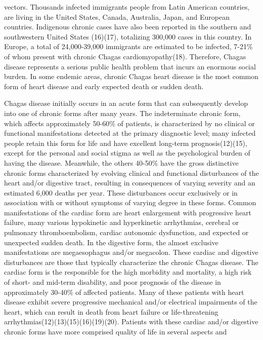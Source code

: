  vectors. Thousands infected immigrants people from Latin American countries, are living
 in the United States, Canada, Australia, Japan, and European countries. Indigenous
 chronic cases have also been reported in the southern and southwestern United States
 (16)(17), totalizing 300,000 cases in this country.
 In Europe, a total of 24,000-39,000 immigrants are estimated to be infected, 7-21\% of
 whom present with chronic Chagas cardiomyopathy(18). Therefore, Chagas disease represents a serious public health problem
 that incurs an enormous social burden. In some endemic areas, chronic Chagas heart
 disease is the most common form of heart disease and early expected death or sudden
 death. \par Chagas disease initially occurs in an acute form that can subsequently develop into one
 of chronic forms after many years. The indeterminate chronic form, which affects
 approximately 50-60\% of patients, is characterized by no clinical or functional
 manifestations detected at the primary diagnostic level; many infected people retain
 this form for life and have excellent long-term prognosis(12)(15), except for the personal and social stigma
 as well as the psychological burden of having the disease. Meanwhile, the others 40-50\%
 have the gross distinctive chronic forms characterized by evolving clinical and
 functional disturbances of the heart and/or digestive tract, resulting in consequences
 of varying severity and an estimated 6,000 deaths per year. These disturbances occur
 exclusively or in association with or without symptoms of varying degree in these forms.
 Common manifestations of the cardiac form are heart enlargement with progressive heart
 failure, many various hypokinetic and hyperkinetic arrhythmias, cerebral or pulmonary
 thromboembolism, cardiac autonomic dysfunction, and expected or unexpected sudden death.
 In the digestive form, the almost exclusive manifestations are megaesophagus and/or
 megacolon. These cardiac and digestive disturbances are those that typically
 characterize the chronic Chagas disease. The cardiac form is the responsible for the
 high morbidity and mortality, a high risk of short- and mid-term disability, and poor
 prognosis of the disease in approximately 30-40\% of affected patients. Many of these
 patients with heart disease exhibit severe progressive mechanical and/or electrical
 impairments of the heart, which can result in death from heart failure or
 life-threatening arrhythmias(12)(13)(15)(16)(19)(20). Patients with these cardiac and/or
 digestive chronic forms have more comprised quality of life in several aspects and
